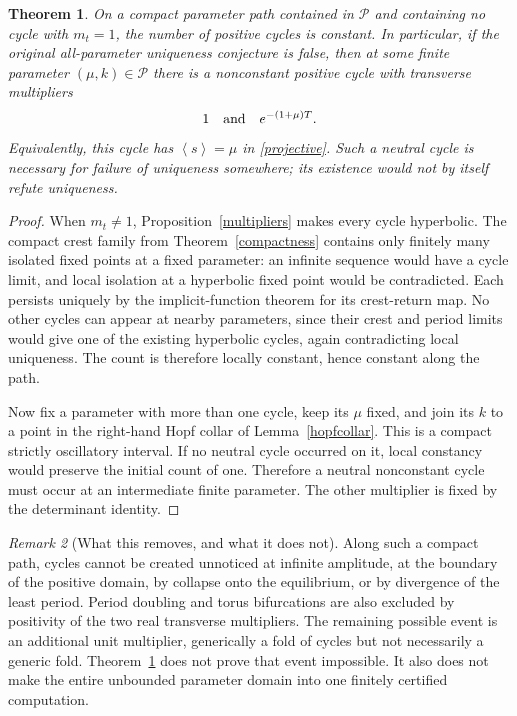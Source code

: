 \documentclass[11pt,a4paper]{article}
\newtheorem{theorem}{Theorem}[section]\newtheorem{lemma}[theorem]{Lemma}
\theoremstyle{remark}\newtheorem{remark}[theorem]{Remark}
\newcommand{\av}[1]{\left\langle #1\right\rangle}
\begin{document}
\begin{theorem}\label{neutraltheorem}
On a compact parameter path contained in $\mathcal P$ and containing no cycle with $m_t=1$, the number of positive cycles is constant. In particular, if the original all-parameter uniqueness conjecture is false, then at some finite parameter $(\mu,k)\in\mathcal P$ there is a nonconstant positive cycle with transverse multipliers
\[
 1\quad\hbox{and}\quad e^{-(1+\mu)T}.
\]
Equivalently, this cycle has $\av{s}=\mu$ in \eqref{projective}. Such a neutral cycle is necessary for failure of uniqueness somewhere; its existence would not by itself refute uniqueness.
\end{theorem}
\begin{proof}
When $m_t\ne1$, Proposition~\ref{multipliers} makes every cycle hyperbolic. The compact crest family from Theorem~\ref{compactness} contains only finitely many isolated fixed points at a fixed parameter: an infinite sequence would have a cycle limit, and local isolation at a hyperbolic fixed point would be contradicted. Each persists uniquely by the implicit-function theorem for its crest-return map. No other cycles can appear at nearby parameters, since their crest and period limits would give one of the existing hyperbolic cycles, again contradicting local uniqueness. The count is therefore locally constant, hence constant along the path.

Now fix a parameter with more than one cycle, keep its $\mu$ fixed, and join its $k$ to a point in the right-hand Hopf collar of Lemma~\ref{hopfcollar}. This is a compact strictly oscillatory interval. If no neutral cycle occurred on it, local constancy would preserve the initial count of one. Therefore a neutral nonconstant cycle must occur at an intermediate finite parameter. The other multiplier is fixed by the determinant identity.
\end{proof}

\begin{remark}[What this removes, and what it does not]
Along such a compact path, cycles cannot be created unnoticed at infinite amplitude, at the boundary of the positive domain, by collapse onto the equilibrium, or by divergence of the least period. Period doubling and torus bifurcations are also excluded by positivity of the two real transverse multipliers. The remaining possible event is an additional unit multiplier, generically a fold of cycles but not necessarily a generic fold. Theorem~\ref{neutraltheorem} does not prove that event impossible. It also does not make the entire unbounded parameter domain into one finitely certified computation.
\end{remark}
\end{document}
